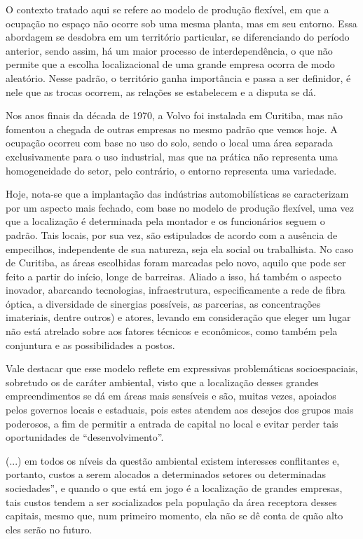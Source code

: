 	O contexto tratado aqui se refere ao modelo de produção flexível, em que a ocupação no espaço não ocorre sob uma mesma planta, mas em seu entorno. Essa abordagem se desdobra em um território particular, se diferenciando do período anterior, sendo assim, há um maior processo de interdependência, o que não permite que a escolha localizacional de uma grande empresa ocorra de modo aleatório. Nesse padrão, o território ganha importância e passa a ser definidor, é nele que as trocas ocorrem, as relações se estabelecem e a disputa se dá. 
	
	Nos anos finais da década de 1970, a Volvo foi instalada em Curitiba, mas não fomentou a chegada de outras empresas no mesmo padrão que vemos hoje. A ocupação ocorreu com base no uso do solo, sendo o local uma área separada exclusivamente para o uso industrial, mas que na prática não representa uma homogeneidade do setor, pelo contrário, o entorno representa uma variedade.
	
	Hoje, nota-se que a implantação das indústrias automobilísticas se caracterizam por um aspecto mais fechado, com base no modelo de produção flexível, uma vez que a localização é determinada pela montador e os funcionários seguem o padrão. Tais locais, por sua vez, são estipulados de acordo com a ausência de empecilhos, independente de sua natureza, seja ela social ou trabalhista. No caso de Curitiba, as áreas escolhidas foram marcadas pelo novo, aquilo que pode ser feito a partir do início, longe de barreiras. Aliado a isso, há também o aspecto inovador, abarcando tecnologias, infraestrutura, especificamente a rede de fibra óptica, a diversidade de sinergias possíveis, as parcerias, as concentrações imateriais, dentre outros) e atores, levando em consideração que eleger um lugar não está atrelado sobre aos fatores técnicos e econômicos, como também pela conjuntura e as possibilidades a postos.

	Vale destacar que esse modelo reflete em expressivas problemáticas socioespaciais, sobretudo os de caráter ambiental, visto que a localização desses grandes empreendimentos se dá em áreas mais sensíveis e são, muitas vezes, apoiados pelos governos locais e estaduais, pois estes atendem aos desejos dos grupos mais poderosos, a fim de permitir a entrada de capital no local e evitar perder tais oportunidades de “desenvolvimento”. 
	
	\begin{citacao}
		(...) em todos os níveis da questão ambiental existem interesses conflitantes e, portanto, custos a serem alocados a determinados setores ou determinadas sociedades”, e quando o que está em jogo é a localização de grandes empresas, tais custos tendem a ser socializados pela população da área receptora desses capitais, mesmo que, num primeiro momento, ela não se dê conta de quão alto eles serão no futuro. 
	\end{citacao}

